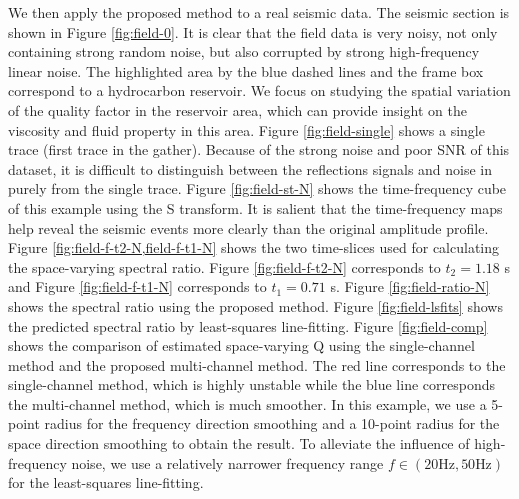 We then apply the proposed method to a real seismic data. The seismic section is shown in Figure \ref{fig:field-0}. It is clear that the field data is very noisy, not only containing strong random noise, but also corrupted by strong high-frequency linear noise. The highlighted area by the blue dashed lines and the frame box correspond to a hydrocarbon reservoir. We focus on studying the spatial variation of the quality factor in the reservoir area, which can provide insight on the viscosity and fluid property in this area. Figure \ref{fig:field-single} shows a single trace (first trace in the gather). Because of the strong noise and poor SNR of this dataset, it is difficult to distinguish between the reflections signals and noise in purely from the single trace.
Figure \ref{fig:field-st-N} shows the time-frequency cube of this example using the S transform. It is salient that the time-frequency maps help reveal the seismic events more clearly than the original amplitude profile. Figure \ref{fig:field-f-t2-N,field-f-t1-N} shows the two time-slices used for calculating the space-varying spectral ratio.  Figure \ref{fig:field-f-t2-N} corresponds to $t_2=1.18$ s and Figure \ref{fig:field-f-t1-N} corresponds to $t_1=0.71$ s. Figure \ref{fig:field-ratio-N} shows the spectral ratio using the proposed method. Figure \ref{fig:field-lsfits} shows the predicted spectral ratio by least-squares line-fitting. Figure \ref{fig:field-comp} shows the comparison of estimated space-varying Q using the single-channel method and the proposed multi-channel method. The red line corresponds to the single-channel method, which is highly unstable while the blue line corresponds the multi-channel method, which is much smoother. In this example, we use a 5-point radius for the frequency direction smoothing and a 10-point radius for the space direction smoothing to obtain the result. To alleviate the influence of high-frequency noise, we use a relatively narrower frequency range $f\in(20 \text{Hz},50 \text{Hz})$ for the least-squares line-fitting. 


